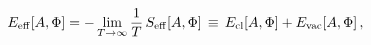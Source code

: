 \begin{equation}
E_{\rm eff}[A,\Phi] =  
- \lim_{T \rightarrow \infty} \frac{1}{T}\, S_{\rm eff}[A,\Phi]  
\,\equiv\,  E_{\rm cl}[A,\Phi] + E_{\rm vac}[A,\Phi] \, ,
\label{Eeff}
\end{equation}

